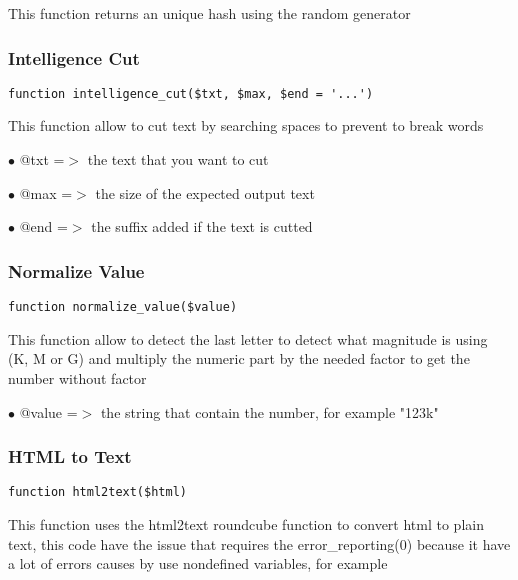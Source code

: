 \documentclass[a4paper]{article}
\begin{document}
This function returns an unique hash using the random generator

\hypertarget{toc242}{}
\subsubsection{Intelligence Cut}

\begin{lstlisting}
function intelligence_cut($txt, $max, $end = '...')
\end{lstlisting}

This function allow to cut text by searching spaces to prevent to break words

\begin{compactitem}
\item[\color{myblue}$\bullet$] @txt =$>$ the text that you want to cut
\item[\color{myblue}$\bullet$] @max =$>$ the size of the expected output text
\item[\color{myblue}$\bullet$] @end =$>$ the suffix added if the text is cutted
\end{compactitem}

\hypertarget{toc243}{}
\subsubsection{Normalize Value}

\begin{lstlisting}
function normalize_value($value)
\end{lstlisting}

This function allow to detect the last letter to detect what magnitude is
using (K, M or G) and multiply the numeric part by the needed factor to
get the number without factor

\begin{compactitem}
\item[\color{myblue}$\bullet$] @value =$>$ the string that contain the number, for example "123k"
\end{compactitem}

\hypertarget{toc244}{}
\subsubsection{HTML to Text}

\begin{lstlisting}
function html2text($html)
\end{lstlisting}

This function uses the html2text roundcube function to convert html to
plain text, this code have the issue that requires the error\_reporting(0)
because it have a lot of errors causes by use nondefined variables, for
example
\end{document}
